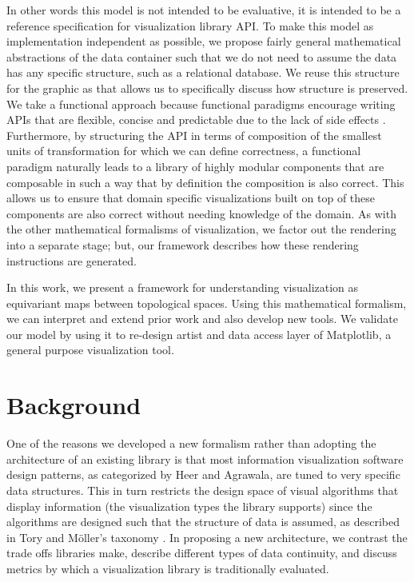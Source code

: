 \documentclass[../main.tex]{subfiles}
\begin{document}
In other words this model is not intended to be evaluative, it is intended to be a reference specification for visualization library API. To make this model as implementation independent as possible, we propose fairly general mathematical abstractions of the data container such that we do not need to assume the data has any specific structure, such as a relational database. We reuse this structure for the graphic as that allows us to specifically discuss how structure is preserved. We take a functional approach because functional paradigms encourage writing APIs that are flexible, concise and predictable due to the lack of side effects \cite{loudenProgrammingLanguagesPrinciples2010}. Furthermore, by structuring the API in terms of composition of the smallest units of transformation for which we can define correctness, a functional paradigm naturally leads to a library of highly modular components that are composable in such a way that by definition the composition is also correct. This allows us to ensure that domain specific visualizations built on top of these components are also correct without needing knowledge of the domain. As with the other mathematical formalisms of visualization, we factor out the rendering into a separate stage; but, our framework describes how these rendering instructions are generated. 

In this work, we present a framework for understanding visualization as equivariant maps between topological spaces. Using this mathematical formalism, we can interpret and extend prior work and also develop new tools. We validate our model by using it to re-design artist and data access layer of Matplotlib, a general purpose visualization tool.
 

\section{Background}
One of the reasons we developed a new formalism rather than adopting the architecture of an existing library is that most information visualization software design patterns, as categorized by Heer and Agrawala\cite{HeerSoftware2006}, are tuned to very specific data structures. This in turn restricts the design space of visual algorithms that display information (the visualization types the library supports) since the algorithms are designed such that the structure of data is assumed, as described in Tory and Möller's taxonomy \cite{toryRethinkingVisualizationHighLevel2004}. In proposing a new architecture, we contrast the trade offs libraries make, describe different types of data continuity, and discuss metrics by which a visualization library is traditionally evaluated. 
\end{document}
